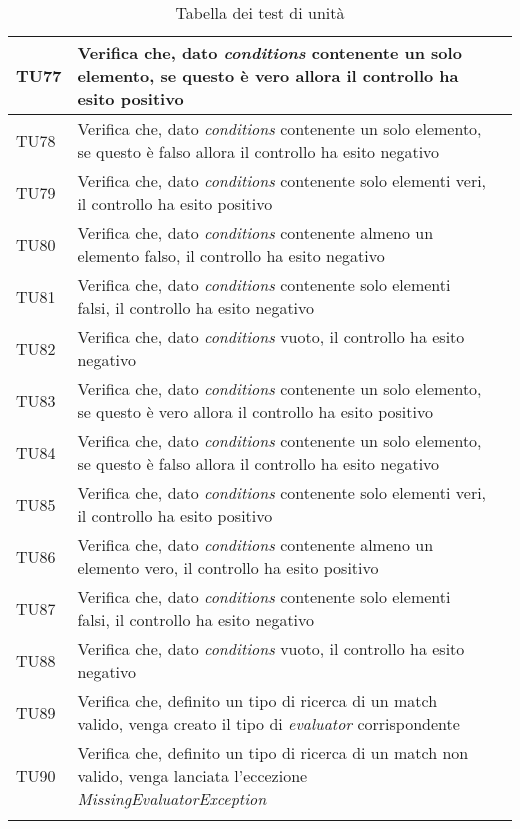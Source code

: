 \begin{longtable}{  | >{\centering\arraybackslash}m{2.5cm} 
						| >{\raggedright\arraybackslash}m{9cm} 
						| >{\centering\arraybackslash}m{3.5cm} | }
				TU77 & Verifica che, dato \textit{conditions} contenente un solo elemento, se questo è vero allora il controllo ha esito positivo
						& \donetext{} \\ \hline
				TU78 & Verifica che, dato \textit{conditions} contenente un solo elemento, se questo è falso allora il controllo ha esito negativo					& \donetext{} \\ \hline
				TU79 & Verifica che, dato \textit{conditions} contenente solo elementi veri, il controllo ha esito positivo
						& \donetext{} \\ \hline
				TU80 & Verifica che, dato \textit{conditions} contenente almeno un elemento falso, il controllo ha esito negativo
						& \donetext{} \\ \hline
				TU81 & Verifica che, dato \textit{conditions} contenente solo elementi falsi, il controllo ha esito negativo
						& \donetext{} \\ \hline
				TU82 & Verifica che, dato \textit{conditions} vuoto, il controllo ha esito negativo
						& \donetext{} \\ \hline




				TU83 & Verifica che, dato \textit{conditions} contenente un solo elemento, se questo è vero allora il controllo ha esito positivo
						& \donetext{} \\ \hline
				TU84 & Verifica che, dato \textit{conditions} contenente un solo elemento, se questo è falso allora il controllo ha esito negativo					& \donetext{} \\ \hline
				TU85 & Verifica che, dato \textit{conditions} contenente solo elementi veri, il controllo ha esito positivo
						& \donetext{} \\ \hline
				TU86 & Verifica che, dato \textit{conditions} contenente almeno un elemento vero, il controllo ha esito positivo
						& \donetext{} \\ \hline
				TU87 & Verifica che, dato \textit{conditions} contenente solo elementi falsi, il controllo ha esito negativo
						& \donetext{} \\ \hline
				TU88 & Verifica che, dato \textit{conditions} vuoto, il controllo ha esito negativo
						& \donetext{} \\ \hline



				TU89 & Verifica che, definito un tipo di ricerca di un match valido, venga creato il tipo di \textit{evaluator} corrispondente
						& \donetext{} \\ \hline
				TU90 & Verifica che, definito un tipo di ricerca di un match non valido, venga lanciata l'eccezione \textit{MissingEvaluatorException}			& \donetext{} \\ \hline





				
	\caption[Test di unità]{Tabella dei test di unità}			
  		
	\end{longtable}


